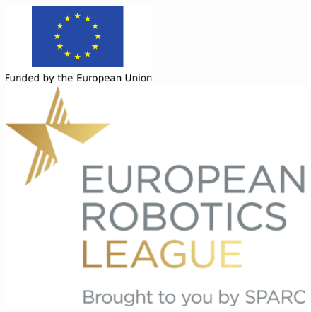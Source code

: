 
\thispagestyle{empty}

\begin{figure}
	\begin{minipage}{.4\textwidth}
		\flushright
		\vspace*{0.8cm}    
		\includegraphics[height=2.9cm]{./fig/logos/EU_flag.pdf}
	\end{minipage}%
	\begin{minipage}{.5\textwidth}
		\flushleft
		\hspace*{60pt}
		\includegraphics[scale=0.26]{./fig/logos/E-Robotics_league_logo.pdf}
	\end{minipage}
\end{figure}

